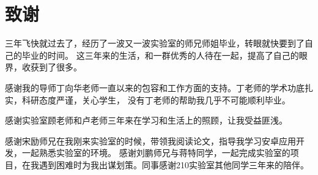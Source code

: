 \chapter{致谢}

三年飞快就过去了，经历了一波又一波实验室的师兄师姐毕业，转眼就快要到了自己的毕业的时间。 这三年来的生活，和一群优秀的人待在一起，提高了自己的眼界，收获到了很多。

感谢我的导师丁向华老师一直以来的包容和工作方面的支持。丁老师的学术功底扎实，科研态度严谨，关心学生， 没有丁老师的帮助我几乎不可能顺利毕业。

感谢实验室顾老师和卢老师三年来在学习和生活上的照顾，让我受益匪浅。

感谢宋励师兄在我刚来实验室的时候，带领我阅读论文，指导我学习安卓应用开发，一起熟悉实验室的环境。 感谢刘鹏师兄与蒋特同学，一起完成实验室的项目，在我遇到困难时为我出谋划策。同事感谢210实验室其他同学三年来的陪伴。

